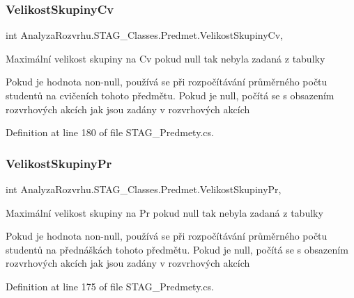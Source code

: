 \subsubsection{\texorpdfstring{Velikost\+Skupiny\+Cv}{VelikostSkupinyCv}}
{\footnotesize\ttfamily int Analyza\+Rozvrhu.\+S\+T\+A\+G\+\_\+\+Classes.\+Predmet.\+Velikost\+Skupiny\+Cv\hspace{0.3cm}{\ttfamily [get]}, {\ttfamily [set]}}



Maximální velikost skupiny na Cv pokud null tak nebyla zadaná z tabulky 

Pokud je hodnota non-\/null, používá se při rozpočítávání průměrného počtu studentů na cvičeních tohoto předmětu. Pokud je null, počítá se s obsazením rozvrhových akcích jak jsou zadány v rozvrhových akcích

Definition at line 180 of file S\+T\+A\+G\+\_\+\+Predmety.\+cs.

\mbox{\label{class_analyza_rozvrhu_1_1_s_t_a_g___classes_1_1_predmet_a02f0915b3e192ca50a5fe7aa0aa3a804}} 
\subsubsection{\texorpdfstring{Velikost\+Skupiny\+Pr}{VelikostSkupinyPr}}
{\footnotesize\ttfamily int Analyza\+Rozvrhu.\+S\+T\+A\+G\+\_\+\+Classes.\+Predmet.\+Velikost\+Skupiny\+Pr\hspace{0.3cm}{\ttfamily [get]}, {\ttfamily [set]}}



Maximální velikost skupiny na Pr pokud null tak nebyla zadaná z tabulky 

Pokud je hodnota non-\/null, používá se při rozpočítávání průměrného počtu studentů na přednáškách tohoto předmětu. Pokud je null, počítá se s obsazením rozvrhových akcích jak jsou zadány v rozvrhových akcích

Definition at line 175 of file S\+T\+A\+G\+\_\+\+Predmety.\+cs.

\mbox{\label{class_analyza_rozvrhu_1_1_s_t_a_g___classes_1_1_predmet_a10acbdb4f1e4ab2856651bf0d2f5066d}} 
